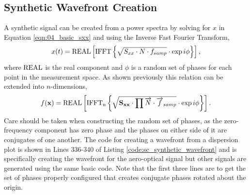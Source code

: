 \subsection{Synthetic Wavefront Creation}
A synthetic signal can be created from a power spectra by solving for $x$ in Equation \ref{eqn:04_basic_sxx} and using the Inverse Fast Fourier Transform,
\begin{equation}
 x(t) = \operatorname{REAL}\left[\operatorname{IFFT}\left\{\sqrt{S_{xx}\cdot N\cdot f_{samp}}\cdot\exp{i\phi}\right\}\right] \textrm{,}
 \label{eqn:04_ifft}
\end{equation}
where $\operatorname{REAL}$ is the real component and $\phi$ is a random set of phases for each point in the measurement space.
As shown previously this relation can be extended into $n$-dimensions,
\begin{equation}
 f(\mathbf{x}) = \operatorname{REAL}\left[\operatorname{IFFT_n}\left\{\sqrt{\mathbf{S_{xx}}\cdot\prod{\overrightarrow{N}\cdot \overrightarrow{f}_{samp}}}\cdot\exp{i\mathbf{\phi}}\right\}\right] \textrm{.}
 \label{eqn:04_ifftn}
\end{equation}
Care should be taken when constructing the random set of phases, as the zero-frequency component has zero phase and the phases on either side of it are conjugates of one another.
The code for creating a wavefront from a dispersion plot is shown in Lines 336-340 of Listing \ref{code:sc_synthetic_wavefront} and is specifically creating the wavefront for the aero-optical signal but other signals are generated using the same basic code.
Note that the first three lines are to get the set of phases properly configured that creates conjugate phases rotated about the origin.

